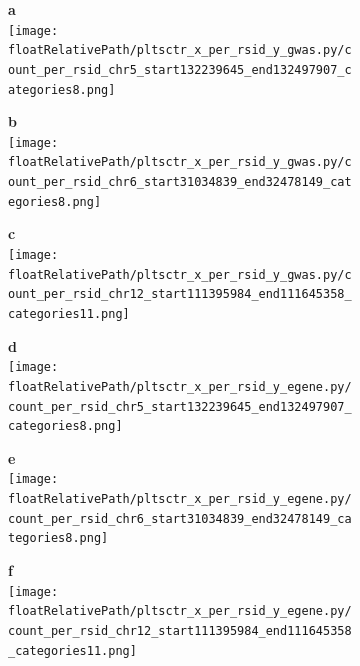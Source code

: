 \begin{figure}[!tbp]

\begin{subfigure}[]{.32\textwidth}
\textbf{a}
\\
\texttt{[image: \\floatRelativePath/pltsctr\_x\_per\_rsid\_y\_gwas.py/count\_per\_rsid\_chr5\_start132239645\_end132497907\_categories8.png]}
\end{subfigure}
%
\begin{subfigure}[]{.32\textwidth}
\textbf{b}
\\
\texttt{[image: \\floatRelativePath/pltsctr\_x\_per\_rsid\_y\_gwas.py/count\_per\_rsid\_chr6\_start31034839\_end32478149\_categories8.png]}
\end{subfigure}
%
\begin{subfigure}[]{.32\textwidth}
\textbf{c}
\\
\texttt{[image: \\floatRelativePath/pltsctr\_x\_per\_rsid\_y\_gwas.py/count\_per\_rsid\_chr12\_start111395984\_end111645358\_categories11.png]}
\end{subfigure}


\begin{subfigure}[]{.32\textwidth}
\textbf{d}
\\
\texttt{[image: \\floatRelativePath/pltsctr\_x\_per\_rsid\_y\_egene.py/count\_per\_rsid\_chr5\_start132239645\_end132497907\_categories8.png]}
\end{subfigure}
%
\begin{subfigure}[]{.32\textwidth}
\textbf{e}
\\
\texttt{[image: \\floatRelativePath/pltsctr\_x\_per\_rsid\_y\_egene.py/count\_per\_rsid\_chr6\_start31034839\_end32478149\_categories8.png]}
\end{subfigure}
%
\begin{subfigure}[]{.32\textwidth}
\textbf{f}
\\
\texttt{[image: \\floatRelativePath/pltsctr\_x\_per\_rsid\_y\_egene.py/count\_per\_rsid\_chr12\_start111395984\_end111645358\_categories11.png]}
\end{subfigure}


\end{figure}
